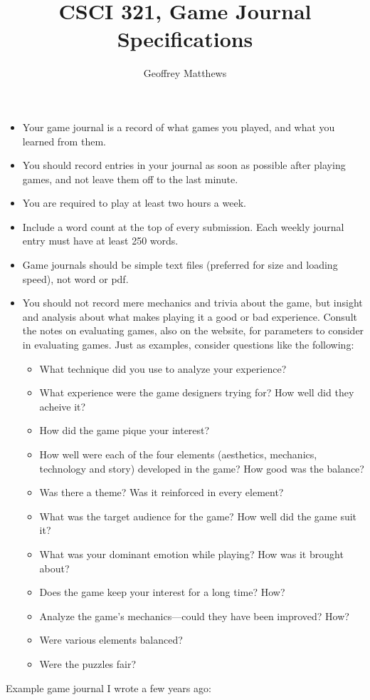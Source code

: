 \documentclass[]{article}
\title{CSCI 321, Game Journal Specifications}
\author{Geoffrey Matthews}
\begin{document}
\maketitle
\begin{itemize}
\item
Your game journal is a record of what games you played, and what you
learned from them.
\item You should record entries in your journal as soon
as possible after playing games, and not leave them off to the last
minute.
\item You are required to play at least two hours a week.
  \item Include a word count at the top of every submission. Each 
weekly  journal entry must have at least 250 words.
  \item Game journals should be simple text files (preferred for size
    and loading speed), not word or pdf.
\item
You should not record mere mechanics and trivia about the game, but
insight and analysis about what makes playing it a good or bad
experience.  Consult the notes on evaluating games, also on the
website, for parameters to consider in evaluating games.  Just as
examples, consider questions like the following:


\begin{itemize}
\item What technique did you use to analyze your experience?
\item What experience were the game designers trying for?  How well
  did they acheive it?
\item How did the game pique your interest?
\item How well were each of the four elements (aesthetics, mechanics,
  technology and story) developed in the game?  How good was the
  balance?
\item Was there a theme?  Was it reinforced in every element?
\item What was the target audience for the game?  How well did the
  game suit it?
\item What was your dominant emotion while playing?  How was it
  brought about?
\item Does the game keep your interest for a long time?  How?
\item Analyze the game's mechanics---could they have been improved?
  How? 
\item Were various elements balanced?
\item Were the puzzles fair?
\end{itemize}

\end{itemize}
Example game journal I wrote a few years ago:
\end{document}
